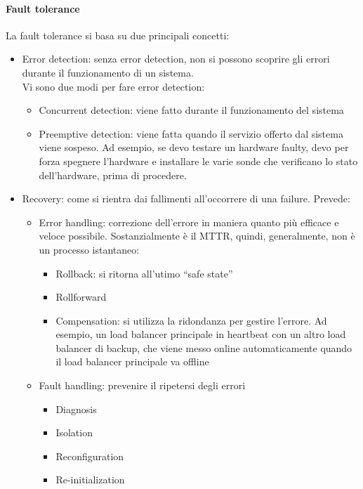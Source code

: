\documentclass{article}
\begin{document}
		\paragraph{Fault tolerance}
		La fault tolerance si basa su due principali concetti:
		\begin{itemize}
			\item Error detection: senza error detection, non si possono scoprire gli errori durante il
			funzionamento di un sistema.\\
			Vi sono due modi per fare error detection:
			\begin{itemize}
				\item Concurrent detection: viene fatto durante il funzionamento del sistema
				\item Preemptive detection: viene fatta quando il servizio offerto dal sistema viene sospeso. Ad
				esempio, se devo testare un hardware faulty, devo per forza spegnere l’hardware e installare le varie sonde che verificano lo stato dell’hardware, prima di procedere.
			\end{itemize}
			\item Recovery: come si rientra dai fallimenti all’occorrere di una failure. Prevede:
			\begin{itemize}
				\item Error handling: correzione dell’errore in maniera quanto più efficace e veloce possibile.
				Sostanzialmente è il MTTR, quindi, generalmente, non è un processo istantaneo:
				\begin{itemize}
					\item Rollback: si ritorna all’utimo “safe state”
					\item Rollforward
					\item Compensation: si utilizza la ridondanza per gestire l’errore. Ad esempio, un load
					balancer principale in heartbeat con un altro load balancer di backup, che viene messo
					online automaticamente quando il load balancer principale va offline
				\end{itemize}
				\item Fault handling: prevenire il ripetersi degli errori
				\begin{itemize}
					\item Diagnosis
					\item Isolation
					\item Reconfiguration
					\item Re-initialization
				\end{itemize}
			\end{itemize}
		\end{itemize}
		
\end{document}
